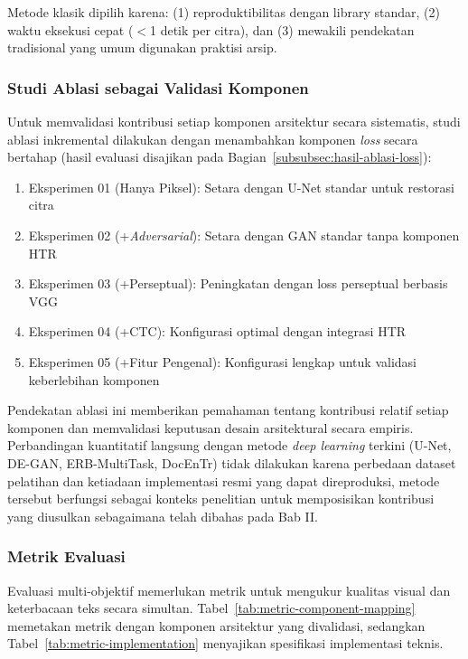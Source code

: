 \documentclass[12pt,a4paper]{article}
\begin{document}
Metode klasik dipilih karena: (1) reproduktibilitas dengan library standar, (2) waktu eksekusi cepat ($<$1 detik per citra), dan (3) mewakili pendekatan tradisional yang umum digunakan praktisi arsip.


\subsubsection{Studi Ablasi sebagai Validasi Komponen}

Untuk memvalidasi kontribusi setiap komponen arsitektur secara sistematis, studi ablasi inkremental dilakukan dengan menambahkan komponen \textit{loss} secara bertahap (hasil evaluasi disajikan pada Bagian~\ref{subsubsec:hasil-ablasi-loss}):

\begin{enumerate}[leftmargin=1.5em, labelsep=0.5em, itemindent=0pt, noitemsep, topsep=0pt]
  \item Eksperimen 01 (Hanya Piksel): Setara dengan U-Net standar untuk restorasi citra
  \item Eksperimen 02 (+\textit{Adversarial}): Setara dengan GAN standar tanpa komponen HTR
  \item Eksperimen 03 (+Perseptual): Peningkatan dengan loss perseptual berbasis VGG
  \item Eksperimen 04 (+CTC): Konfigurasi optimal dengan integrasi HTR
  \item Eksperimen 05 (+Fitur Pengenal): Konfigurasi lengkap untuk validasi keberlebihan komponen
\end{enumerate}

Pendekatan ablasi ini memberikan pemahaman tentang kontribusi relatif setiap komponen dan memvalidasi keputusan desain arsitektural secara empiris. Perbandingan kuantitatif langsung dengan metode \textit{deep learning} terkini (U-Net, DE-GAN, ERB-MultiTask, DocEnTr) tidak dilakukan karena perbedaan dataset pelatihan dan ketiadaan implementasi resmi yang dapat direproduksi, metode tersebut berfungsi sebagai konteks penelitian untuk memposisikan kontribusi yang diusulkan sebagaimana telah dibahas pada Bab II.

\subsubsection{Metrik Evaluasi}
\label{subsubsec:metrik-evaluasi}

Evaluasi multi-objektif memerlukan metrik untuk mengukur kualitas visual dan keterbacaan teks secara simultan. Tabel~\ref{tab:metric-component-mapping} memetakan metrik dengan komponen arsitektur yang divalidasi, sedangkan Tabel~\ref{tab:metric-implementation} menyajikan spesifikasi implementasi teknis.
\end{document}
